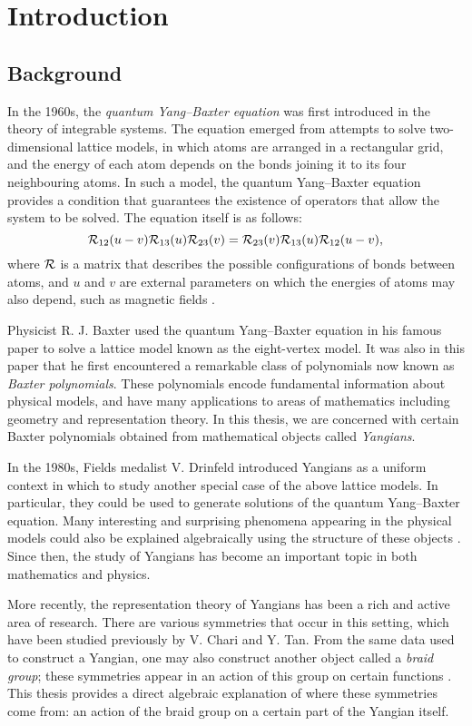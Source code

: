 \chapter{Introduction}

\section{Background}

In the 1960s, the \emph{quantum Yang--Baxter equation} was first introduced in the theory of integrable systems.
The equation emerged from attempts to solve two-dimensional lattice models, in which atoms are arranged in a rectangular grid, and the energy of each atom depends on the bonds joining it to its four neighbouring atoms.
In such a model, the quantum Yang--Baxter equation provides a condition that guarantees the existence of operators that allow the system to be solved.
The equation itself is as follows:
\[\mathcal{R}_{12}(u-v)\mathcal{R}_{13}(u)\mathcal{R}_{23}(v) = \mathcal{R}_{23}(v)\mathcal{R}_{13}(u)\mathcal{R}_{12}(u-v),\]
where $\mathcal{R}$ is a matrix that describes the possible configurations of bonds between atoms, and $u$ and $v$ are external parameters on which the energies of atoms may also depend, such as magnetic fields \cite[\S 7.5]{chari_guide_1995}.

Physicist R. J. Baxter used the quantum Yang--Baxter equation in his famous paper \cite{baxter_partition_1972} to solve a lattice model known as the eight-vertex model.
It was also in this paper that he first encountered a remarkable class of polynomials now known as \emph{Baxter polynomials}.
These polynomials encode fundamental information about physical models, and have many applications to areas of mathematics including geometry and representation theory.
In this thesis, we are concerned with certain Baxter polynomials obtained from mathematical objects called \emph{Yangians}.

In the 1980s, Fields medalist V. Drinfeld introduced Yangians as a uniform context in which to study another special case of the above lattice models.
In particular, they could be used to generate solutions of the quantum Yang--Baxter equation.
Many interesting and surprising phenomena appearing in the physical models could also be explained algebraically using the structure of these objects \cite{drinfeld_hopf_1985}.
Since then, the study of Yangians has become an important topic in both mathematics and physics.

More recently, the representation theory of Yangians has been a rich and active area of research.
There are various symmetries that occur in this setting, which have been studied previously by V. Chari and Y. Tan.
From the same data used to construct a Yangian, one may also construct another object called a \emph{braid group}; these symmetries appear in an action of this group on certain functions \cite{chari_braid_2002,tan_braid_2015}.
This thesis provides a direct algebraic explanation of where these symmetries come from: an action of the braid group on a certain part of the Yangian itself.


